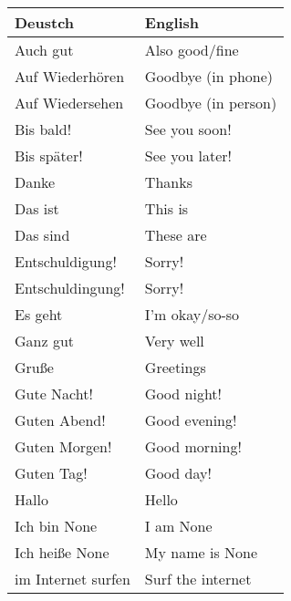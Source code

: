 \documentclass{article}
\renewcommand{\arraystretch}{1}
\begin{document}
\begin{minipage}{0.48\textwidth}
    \centering
    \renewcommand{\arraystretch}{1.5}
    \begin{tabular}{|>{\raggedright\arraybackslash}p{3.5cm}|>{\raggedright\arraybackslash}p{3.5cm}|}
        \hline
        \rowcolor{gray!20} \textbf{Deustch} & \textbf{English} \\
        \hline
        Auch gut & Also good/fine \\\hline
        Auf Wiederhören & Goodbye (in phone) \\\hline
        Auf Wiedersehen & Goodbye (in person) \\\hline
        Bis bald! & See you soon! \\\hline
        Bis später! & See you later! \\\hline
        Danke &  Thanks \\\hline
        Das ist &  This is \\\hline
        Das sind &  These are \\\hline
        Entschuldigung! & Sorry! \\\hline
        Entschuldingung! & Sorry! \\\hline
        Es geht & I'm okay/so-so \\\hline
        Ganz gut & Very well \\\hline
        Gru\ss{}e & Greetings \\\hline
        Gute Nacht! &  Good night! \\\hline
        Guten Abend! &  Good evening! \\\hline
        Guten Morgen! &  Good morning! \\\hline
        Guten Tag! &  Good day! \\\hline
        Hallo & Hello \\\hline
        Ich bin None & I am None \\\hline
        Ich hei\ss{}e None & My name is None \\\hline
        im Internet surfen &  Surf the internet \\\hline
    \end{tabular}
\end{minipage}%
\hfill
\end{document}

